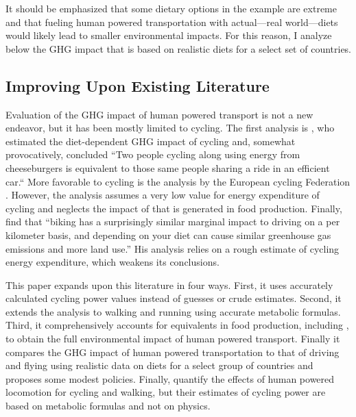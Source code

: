 \documentclass{article}[12pt,letterpaper]
\begin{document}
It should be emphasized that some dietary options in the example are extreme and that fueling human powered transportation with actual---real world---diets would likely lead to smaller environmental impacts. For this reason, I analyze below the GHG impact that is based on realistic diets for a select set of countries.

\subsection{Improving Upon Existing Literature}
Evaluation of the GHG impact of human powered transport is not a new endeavor, but it has been mostly limited to cycling. The first analysis is \citet{berners-lee-2010}, who estimated the diet-dependent GHG impact of cycling and, somewhat provocatively, concluded ``Two people cycling along using energy from cheeseburgers is equivalent to those same people sharing a ride in an efficient car.``
More favorable to cycling is the analysis by the European cycling Federation \citet{ecf2011}. However, the analysis assumes a very low value for energy expenditure of cycling and neglects the impact of \methane that is generated in food production. Finally, \citet{thorpe-keith_2016} find that ``biking has a surprisingly similar marginal impact to driving on a per kilometer basis, and depending on your diet can cause similar greenhouse gas emissions and more land use.'' His analysis relies on a rough estimate of cycling energy expenditure, which weakens its conclusions.

This paper expands upon this literature in four ways. First, it uses accurately calculated cycling power values instead of guesses or crude estimates. Second, it extends the analysis to walking and running using accurate metabolic formulas. Third, it comprehensively accounts for \cadi equivalents in food production, including \methane, to obtain the full environmental impact of human powered transport. Finally it compares the GHG impact of human powered transportation to that of driving and flying using realistic data on diets for a select group of countries and proposes some modest policies. Finally, \citet{Mizdrak2020} quantify the effects of human powered locomotion for cycling and walking, but their estimates of cycling power are based on metabolic formulas and not on physics.
\end{document}
